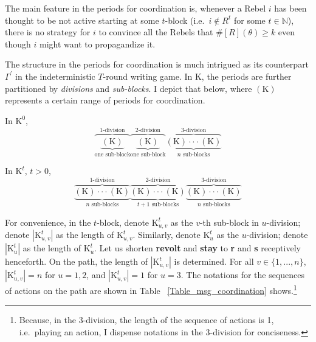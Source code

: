 \documentclass[12pt,letter]{article}
\newcommand{\Kappa}{\mathrm{K}}
\theoremstyle{definition}
\theoremstyle{remark}
\theoremstyle{claim}
\begin{document}
The main feature in the periods for coordination is, whenever a Rebel $i$ has been thought to be not active starting at some $t$-block (i.e.~$i\notin R^t$ for some $t\in \mathbb{N}$), there is no strategy for $i$ to convince all the Rebels that $\#[R](\theta)\geq k$ even though $i$ might want to propagandize it.

The structure in the periods for coordination is much intrigued as its counterpart $\Gamma^{'}$ in the indeterministic $T$-round writing game. In $\Kappa$, the periods are further partitioned by \textit{divisions} and \textit{sub-blocks}. I depict that below, where $(\Kappa)$ represents a certain range of periods for coordination. 



In $\Kappa^0$, 
\[\overbrace{\underbrace{( \Kappa) }_{\text{one sub-block}}}^{\text{$1$-division}} \overbrace{\underbrace{(\Kappa) }_{\text{one sub-block}}}^{\text{$2$-division}} \overbrace{\underbrace{(\Kappa) \cdot \cdot \cdot (\Kappa)}_{\text{$n$ sub-blocks}}}^{\text{$3$-division}}\] 

In $\Kappa^t$, $t>0$,
\[\overbrace{\underbrace{(\Kappa) \cdot \cdot \cdot (\Kappa)}_{\text{$n$ sub-blocks}}}^{\text{$1$-division}} \overbrace{\underbrace{(\Kappa) \cdot \cdot \cdot (\Kappa)}_{\text{$t+1$ sub-blocks}} }^{\text{$2$-division}} \overbrace{\underbrace{(\Kappa) \cdot \cdot \cdot (\Kappa)}_{\text{$n$ sub-blocks}}}^{\text{$3$-division}}\] 




For convenience, in the $t$-block, denote $\Kappa^t_{u,v}$ as the $v$-th sub-block in $u$-division; denote $|\Kappa^t_{u,v} |$ as the length of $\Kappa^t_{u,v}$. Similarly, denote $\Kappa^t_{u}$ as the $u$-division; denote $|\Kappa^t_{u} |$ as the length of $\Kappa^t_{u}$. Let us shorten \textbf{revolt} and \textbf{stay} to \textbf{r} and \textbf{s} receptively henceforth. On the path, the length of $|\Kappa^t_{u,v}|$ is determined. For all $v\in \{1,...,n\}$, $|\Kappa^t_{u,v}|=n$ for $u=1,2$, and $|\Kappa^t_{u,v}|=1$ for $u=3$. The notations for the sequences of actions on the path are shown in Table ~\ref{Table_msg_coordination} shows.\footnote{Because, in the $3$-division, the length of the sequence of actions is 1, i.e.~playing an action, I dispense notations in the $3$-division for conciseness.}
\end{document}
